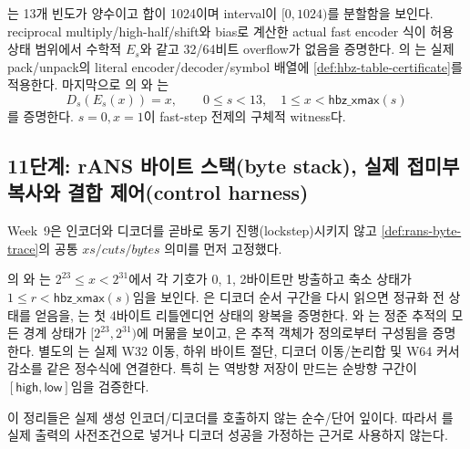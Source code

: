 \begin{verified}
\label{thm:hbz-rans-step}
는 13개 빈도가 양수이고 합이 1024이며
interval이 \([0,1024)\)를 분할함을 보인다. reciprocal multiply/high-half/shift와
bias로 계산한 actual fast encoder 식이 허용 상태 범위에서 수학적
\(E_s\)와 같고 32/64비트 overflow가 없음을 증명한다.
의
는 실제 pack/unpack의 literal
encoder/decoder/symbol 배열에 \cref{def:hbz-table-certificate}를 적용한다.
마지막으로 의
와
는
\[
  D_s(E_s(x))=x,\qquad
  0\le s<13,\quad 1\le x<\mathsf{hbz\_xmax}(s)
\]
를 증명한다. \(s=0,x=1\)이 fast-step 전제의 구체적 witness다.
\end{verified}

\subsection{11단계: rANS 바이트 스택(byte stack), 실제 접미부 복사와 결합 제어(control harness)}

Week~9은 인코더와 디코더를 곧바로 동기 진행(lockstep)시키지 않고
\cref{def:rans-byte-trace}의 공통 \(xs/cuts/bytes\) 의미를 먼저 고정했다.

\begin{verified}
\label{thm:rans-byte-stack}
의 와
는 \(2^{23}\le x<2^{31}\)에서 각 기호가
0, 1, 2바이트만 방출하고 축소 상태가
\(1\le r<\mathsf{hbz\_xmax}(s)\)임을 보인다.
은 디코더 순서 구간을 다시 읽으면
정규화 전 상태를 얻음을, 는 첫
4바이트 리틀엔디언 상태의 왕복을 증명한다.
와
는 정준 추적의 모든 경계 상태가
\([2^{23},2^{31})\)에 머묾을 보이고,
은 추적 객체가 정의로부터 구성됨을
증명한다. 별도의 는 실제 W32 이동,
하위 바이트 절단, 디코더 이동/논리합 및 W64 커서 감소를 같은 정수식에
연결한다. 특히 는 역방향 저장이
만드는 순방향 구간이 \([\mathsf{high},\mathsf{low}]\)임을 검증한다.
\end{verified}

이 정리들은 실제 생성 인코더/디코더를 호출하지 않는 순수/단어 잎이다.
따라서 를 실제 출력의 사전조건으로 넣거나
디코더 성공을 가정하는 근거로 사용하지 않는다.

